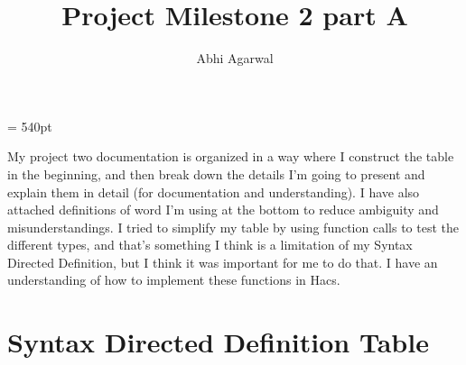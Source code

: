 \documentclass[11pt, oneside]{article}
\title{Project Milestone 2 part A}
\author{Abhi Agarwal}
\date{}
\begin{document}
\maketitle

\textwidth = 540pt

\par My project two documentation is organized in a way where I construct the table in the beginning, and then break down the details I'm going to present and explain them in detail (for documentation and understanding). I have also attached definitions of word I'm using at the bottom to reduce ambiguity and misunderstandings. I tried to simplify my table by using function calls to test the different types, and that's something I think is a limitation of my Syntax Directed Definition, but I think it was important for me to do that. I have an understanding of how to implement these functions in Hacs.

\section*{Syntax Directed Definition Table}
\end{document}
